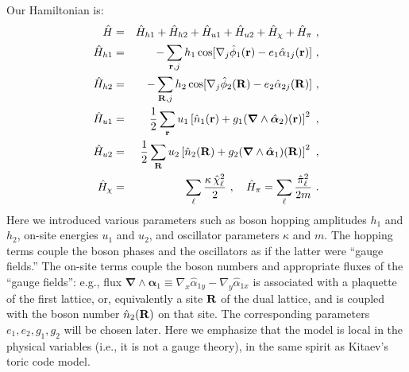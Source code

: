 %


Our Hamiltonian is:
\begin{eqnarray}
\label{H}
\hat{H} &=& \hat{H}_{h1} + \hat{H}_{h2} + \hat{H}_{u1} + \hat{H}_{u2} + \hat{H}_\chi + \hat{H}_\pi ~,\\
\hat{H}_{h1} &=& -\sum_{{\bf r}, j} h_1 \cos[\nabla_j \hat{\phi}_1({\bf r}) - e_1 \hat{\alpha}_{1j}({\bf r})] ~,\\
\hat{H}_{h2} &=& -\sum_{{\bf R}, j} h_2 \cos[\nabla_j \hat{\phi}_2({\bf R}) - e_2 \hat{\alpha}_{2j}({\bf R})] ~,\\
\hat{H}_{u1} &=& \frac{1}{2} \sum_{\bf r} u_1 \left[\hat{n}_1({\bf r}) + g_1 ({\bm \nabla} \wedge \hat{\bm \alpha}_2)({\bf r}) \right]^2 ~,\\
\hat{H}_{u2} &=& \frac{1}{2} \sum_{\bf R} u_2 \left[\hat{n}_2({\bf R}) + g_2 ({\bm \nabla} \wedge \hat{\bm \alpha}_1)({\bf R}) \right]^2 ~,\\
\hat{H}_\chi &=& \sum_\ell \frac{\kappa\, \hat{\chi}_\ell^2}{2} ~, \quad
\hat{H}_\pi = \sum_\ell \frac{\hat{\pi}_\ell^2}{2m} ~.
\end{eqnarray}
Here we introduced various parameters such as boson hopping amplitudes $h_1$ and $h_2$, on-site energies $u_1$ and $u_2$, and oscillator parameters $\kappa$ and $m$.  The hopping terms couple the boson phases and the oscillators as if the latter were ``gauge fields.''  The on-site terms couple the boson numbers and appropriate fluxes of the ``gauge fields'': e.g., flux ${\bm \nabla} \wedge \hat{\bm \alpha}_1 \equiv \nabla_x \hat{\alpha}_{1y} - \nabla_y \hat{\alpha}_{1x}$ is associated with a plaquette of the first lattice, or, equivalently a site ${\bf R}$ of the dual lattice, and is coupled with the boson number $\hat{n}_2({\bf R})$ on that site.  The corresponding parameters $e_1, e_2, g_1, g_2$ will be chosen later. 
Here we emphasize that the model is local in the physical variables (i.e., it is not a gauge theory), in the same spirit as Kitaev's toric code model.

